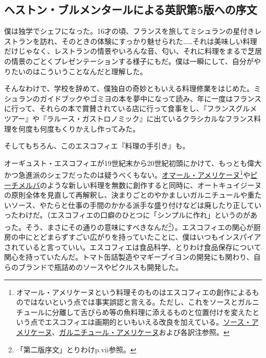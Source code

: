 \setlength{\parindent}{1\zw}

\vspace*{4\zw}

\begin{Main}

\hypertarget{preface-heston-blumenthal}{%
\section{ヘストン・ブルメンタールによる英訳第5版への序文}\label{preface-heston-blumenthal}}

\vspace{2\zw}
\thispagestyle{empty}

僕は独学でシェフになった。16才の頃、フランスを旅してミシュランの星付きレストランを訪れ、そのときの体験にすっかり魅せられた\ldots{}\ldots{}それは美味しい料理だけじゃなく、レストランの情景やいろんな音、匂い、それに料理をまるで芝居の情景のごとくプレゼンテーションする様子にもだ。僕は一瞬にして、自分がやりたいのはこういうことなんだと理解した。

そんなわけで、学校を辞めて、僕独自の奇妙ともいえる料理修業をはじめた。ミシュランのガイドブックやゴミヨの本を夢中になって読み、年に一度はフランスに行って、それらの本で賞賛されている店に行って食事をし、『フランスグルメツアー』や『ラルース・ガストロノミック』に出ているクラシカルなフランス料理を何度も何度もくりかえし作ってみた。

そしてもちろん、このエスコフィエ『料理の手引き』も。

オーギュスト・エスコフィエが19世紀末から20世紀初頭にかけて、もっとも偉大かつ急進派のシェフだったのは疑うべくもない。\protect\hyperlink{homard-americaine}{オマール・アメリケーヌ}\footnote{オマール・アメリケーヌという料理そのものはエスコフィエの創作によるものではないという点では事実誤認と言える。ただし、これをソースとガルニチュールに分離して舌びらめ等の魚料理に添えるものと位置付けを変えたという点でエスコフィエは画期的といもいえる改良を加えている。\protect\hyperlink{sauce-americaine}{ソース・アメリケーヌ}、\protect\hyperlink{garniture-americaine}{ガルニチュール・アメリケーヌ}および各訳注参照。}や\protect\hyperlink{peches-melba}{ピーチメルバ}のような新しい料理を無数に創作すると同時に、オートキュイジーヌの原則全体を見直して再解釈し、決まりごとのやかましいガルニチュールや重たいソース、やたらと仕事の手間のかかる派手な盛り付けなどは廃したり正していったわけだ。（エスコフィエの口癖のひとつに「シンプルに作れ」というのがあった。そう、まさにその通りの意味にすべきなんだ\footnote{\protect\hypertarget{la-simplicite}{}{「第二版序文」とりわけp.vii}参照。}）。エスコフィエの関心が厨房の中にとどまらずすごい広がりを持っていたことに、僕はいつもインスパイアされていると言っていい。エスコフィエは食品科学、とりわけ食品保存について関心を持っていたんだ。トマト缶詰製造やマギーブイヨンの開発にも関わり、自らのブランドで瓶詰めのソースやピクルスも開発した。


\end{Main}

